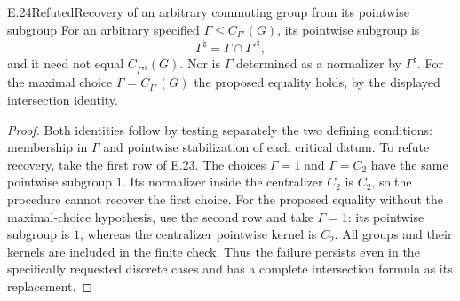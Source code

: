 \begin{claim}{E.24}{Refuted}{Recovery of an arbitrary commuting group from its pointwise subgroup}
For an arbitrary specified $\Gamma\leq C_{\Gamma'}(G)$, its pointwise subgroup is
\[
 \Gamma^{\natural}=\Gamma\cap\Gamma'^{\natural},
\]
and it need not equal $C_{\Gamma'^{\natural}}(G)$. Nor is $\Gamma$ determined as a normalizer by $\Gamma^{\natural}$. For the maximal choice $\Gamma=C_{\Gamma'}(G)$ the proposed equality holds, by the displayed intersection identity.
\end{claim}
\begin{proof}
Both identities follow by testing separately the two defining conditions: membership in $\Gamma$ and pointwise stabilization of each critical datum. To refute recovery, take the first row of E.23. The choices $\Gamma=1$ and $\Gamma=C_2$ have the same pointwise subgroup $1$. Its normalizer inside the centralizer $C_2$ is $C_2$, so the procedure cannot recover the first choice. For the proposed equality without the maximal-choice hypothesis, use the second row and take $\Gamma=1$: its pointwise subgroup is $1$, whereas the centralizer pointwise kernel is $C_2$. All groups and their kernels are included in the finite check. Thus the failure persists even in the specifically requested discrete cases and has a complete intersection formula as its replacement.
\end{proof}
